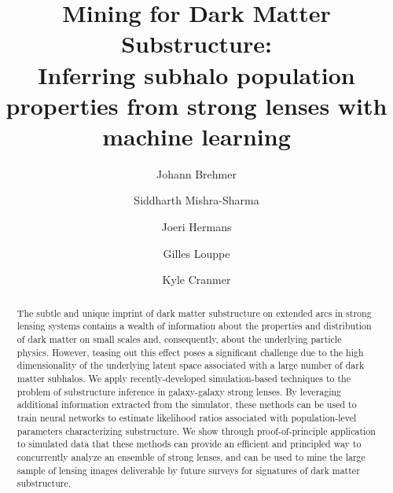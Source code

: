 \documentclass[twocolumn]{aastex62}
\begin{document}
\sloppy\sloppypar\raggedbottom\frenchspacing

\title{\textbf{
Mining for Dark Matter Substructure: \\
Inferring subhalo population properties from strong lenses with machine learning
}}


\author[0000-0003-3344-4209]{Johann Brehmer}

\author[0000-0001-9088-7845]{Siddharth Mishra-Sharma}

\author{Joeri Hermans}

\author[0000-0002-2082-3106]{Gilles Louppe}

\author[0000-0002-5769-7094]{Kyle Cranmer}

\begin{abstract}\noindent
The subtle and unique imprint of dark matter substructure on extended arcs in strong lensing systems contains a wealth of information about the properties and distribution of dark matter on small scales and, consequently, about the underlying particle physics. However, teasing out this effect poses a significant challenge due to the high dimensionality of the underlying latent space associated with a large number of dark matter subhalos. We apply recently-developed simulation-based techniques to the problem of substructure inference in galaxy-galaxy strong lenses. By leveraging additional information extracted from the simulator, these methods can be used to train neural networks to estimate likelihood ratios associated with population-level parameters characterizing substructure. We show through proof-of-principle application to simulated data that these methods can provide an efficient and principled way to concurrently analyze an ensemble of strong lenses, and can be used to mine the large sample of lensing images deliverable by future surveys for signatures of dark matter substructure.  \href{https://github.com/smsharma/StrongLensing-Inference}{\faGithub}
\end{abstract}
\end{document}
